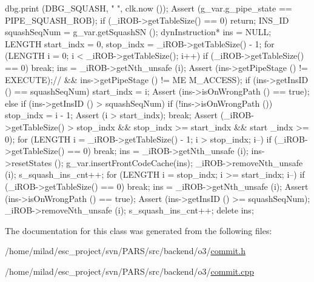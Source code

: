 \begin{DoxyCode}
                                     {
    dbg.print (DBG_SQUASH, "%
      ", clk.now ());
    Assert (g_var.g_pipe_state == PIPE_SQUASH_ROB);
    if (_iROB->getTableSize() == 0) return;
    INS_ID squashSeqNum = g_var.getSquashSN ();
    dynInstruction* ins = NULL;
    LENGTH start_indx = 0, stop_indx = _iROB->getTableSize() - 1;
    for (LENGTH i = 0; i < _iROB->getTableSize(); i++) {
        if (_iROB->getTableSize() == 0) break;
        ins = _iROB->getNth_unsafe (i);
        Assert (ins->getPipeStage () != EXECUTE);// && ins->getPipeStage () != ME
      M_ACCESS);
        if (ins->getInsID () == squashSeqNum) {
            start_indx = i;
            Assert (ins->isOnWrongPath () == true);
        } else if (ins->getInsID () > squashSeqNum) {
            if (!ins->isOnWrongPath ()) {
                stop_indx = i - 1;
                Assert (i > start_indx);
                break;
            }
        }
    }
    Assert (_iROB->getTableSize() > stop_indx && stop_indx >= start_indx && start
      _indx >= 0);
    for (LENGTH i = _iROB->getTableSize() - 1; i > stop_indx; i--) {
        if (_iROB->getTableSize() == 0) break;
        ins = _iROB->getNth_unsafe (i);
        ins->resetStates ();
        g_var.insertFrontCodeCache(ins);
        _iROB->removeNth_unsafe (i);
        s_squash_ins_cnt++;
    }
    for (LENGTH i = stop_indx; i >= start_indx; i--) {
        if (_iROB->getTableSize() == 0) break;
        ins = _iROB->getNth_unsafe (i);
        Assert (ins->isOnWrongPath () == true);
        Assert (ins->getInsID () >= squashSeqNum);
        _iROB->removeNth_unsafe (i);
        s_squash_ins_cnt++;
        delete ins;
    }
}
\end{DoxyCode}


The documentation for this class was generated from the following files:\begin{DoxyCompactItemize}
\item 
/home/milad/esc\_\-project/svn/PARS/src/backend/o3/\hyperlink{o3_2commit_8h}{commit.h}\item 
/home/milad/esc\_\-project/svn/PARS/src/backend/o3/\hyperlink{o3_2commit_8cpp}{commit.cpp}\end{DoxyCompactItemize}
